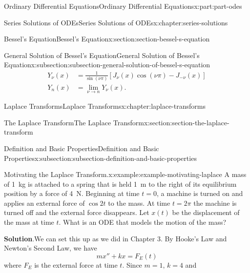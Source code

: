 \documentclass[twoside,10pt,]{book}
\newcommand{\blocktitlefont}{\relax}
\numberwithin{equation}{part}
\newcommand{\amp}{&}
\begin{document}
\begin{partptx}{Ordinary Differential Equations}{}{Ordinary Differential Equations}{}{}{x:part:part-odes}
\begin{chapterptx}{Series Solutions of ODEs}{}{Series Solutions of ODEs}{}{}{x:chapter:series-solutions}
\begin{sectionptx}{Bessel's Equation}{}{Bessel's Equation}{}{}{x:section:section-bessel-s-equation}
\begin{subsectionptx}{General Solution of Bessel's Equation}{}{General Solution of Bessel's Equation}{}{}{x:subsection:subsection-general-solution-of-bessel-s-equation}
\begin{align}
Y_{\nu}(x) \amp = \frac{1}{\sin(\nu\pi)}[J_{\nu}(x)\cos(\nu\pi) - J_{-\nu}(x)]\label{x:mrow:equation-bessel-second-kind-noninteger}\\
Y_{n}(x) \amp = \lim_{\nu\to n}Y_{\nu}(x)\text{.}\label{x:mrow:equation-bessel-second-kind-integer}
\end{align}
%
\end{subsectionptx}
\end{sectionptx}
\end{chapterptx}
%
\typeout{************************************************}
\typeout{************************************************}
%
\begin{chapterptx}{Laplace Transforms}{}{Laplace Transforms}{}{}{x:chapter:laplace-transforms}
%
%
\typeout{************************************************}
\typeout{************************************************}
%
\begin{sectionptx}{The Laplace Transform}{}{The Laplace Transform}{}{}{x:section:section-the-laplace-transform}
%
%
\typeout{************************************************}
\typeout{************************************************}
%
\begin{subsectionptx}{Definition and Basic Properties}{}{Definition and Basic Properties}{}{}{x:subsection:subsection-definition-and-basic-properties}
\begin{example}{Motivating the Laplace Transform.}{x:example:example-motivating-laplace}%
A mass of \SI{1}{\kilogram} is attached to a spring that is held \SI{1}{\meter} to the right of its equilibrium position by a force of \SI{4}{\newton}. Beginning at time \(t=0\), a machine is turned on and applies an external force of \(\cos2t\) to the mass. At time \(t=2\pi\) the machine is turned off and the external force disappears. Let \(x(t)\) be the displacement of the mass at time \(t\). What is an ODE that models the motion of the mass?%
\par\smallskip%
\noindent\textbf{\blocktitlefont Solution}.\hypertarget{g:solution:idp105548817457568}{}\quad{}We can set this up as we did in Chapter 3. By Hooke's Law and Newton's Second Law, we have%
\begin{equation*}
mx''+kx = F_{E}(t)
\end{equation*}
where \(F_{E}\) is the external force at time \(t\). Since \(m = 1\), \(k = 4\) and%
\begin{equation*}

\end{equation*}
\end{example}
\end{subsectionptx}
\end{sectionptx}
\end{chapterptx}
\end{partptx}
\end{document}
